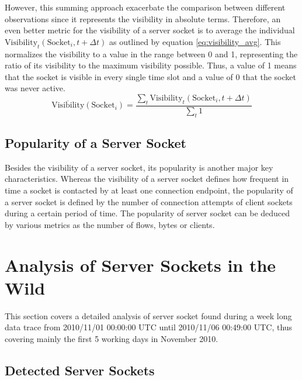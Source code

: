 However, this summing approach exacerbate the comparison between different observations since it represents the visibility in absolute terms. Therefore, an even better metric for the visibility of a server socket is to average the individual $\text{Visibility}_t(\text{Socket}_i,t+\Delta{t})$ as outlined by equation \ref{eq:visibility_avg}. This normalizes the visibility to a value in the range between 0 and 1, representing the ratio of its visibility to the maximum visibility possible. Thus, a value of 1 means that the socket is visible in every single time slot and a value of 0 that the socket was never active. 
\begin{equation}
	\overline{\text{Visibility}}(\text{Socket}_i) = \frac{\sum_{t} \text{Visibility}_t(\text{Socket}_i,t+\Delta{t})}{\sum_{t}1}
	\label{eq:visibility_avg} 
\end{equation}

\subsection{Popularity of a Server Socket}

Besides the visibility of a server socket, its popularity is another major key characteristics. Whereas the visibility of a server socket defines how frequent in time a socket is contacted by at least one connection endpoint, the popularity of a server socket is defined by the number of connection attempts of client sockets during a certain period of time. The popularity of server socket can be deduced by various metrics as the number of flows, bytes or clients.


\section{Analysis of Server Sockets in the Wild}

This section covers a detailed analysis of server socket found during a week long data trace from 2010/11/01 00:00:00 UTC until 2010/11/06 00:49:00 UTC, thus covering mainly the first 5 working days in November 2010.

\subsection{Detected Server Sockets}

